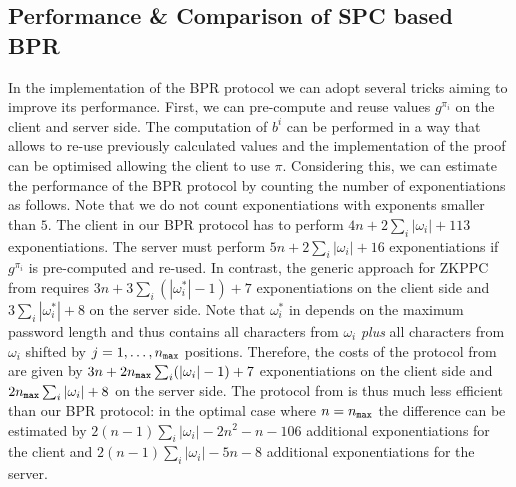 \subsection{Performance \& Comparison of SPC based BPR} \label{sec:performance}
In the implementation of the \ac{BPR} protocol we can adopt several tricks aiming to improve its performance. First, we can pre-compute and reuse values $g^{\pi_i}$ on the client and server side.
The computation of $b^i$ can be performed in a way that allows to re-use previously calculated values and the implementation of the proof can be optimised allowing the client to use $\pi$.
Considering this, we can estimate the performance of the \ac{BPR} protocol by counting the number of exponentiations as follows.
Note that we do not count exponentiations with exponents smaller than $5$.
%
The client in our BPR protocol has to perform $4n+2\sum_i |\omega_i| + 113$ exponentiations.
The server must perform $5n + 2\sum_i |\omega_i| + 16$ exponentiations if $g^{\pi_i}$ is pre-computed and re-used.
In contrast, the generic approach for ZKPPC from \cite{KieferM14} requires $3n+3\sum_i (|\omega^\ast_i|-1)+7$ exponentiations on the client side and $3\sum_i |\omega^\ast_i|+8$ on the server side.
Note that $\omega^\ast_i$ in \cite{KieferM14} depends on the maximum password length and thus contains all characters from $\omega_i$ \emph{plus} all characters from $\omega_i$ shifted by $j = 1,\ldots, {n_\mathtt{max}}$ positions.
Therefore, the costs of the protocol from \cite{KieferM14} are given by $3n+2{n_\mathtt{max}}\sum_i (|\omega_i|-1)+7$ exponentiations on the client side and $2{n_\mathtt{max}}\sum_i |\omega_i|+8$ on the server side. The protocol from \cite{KieferM14} is thus much less efficient than our BPR protocol: in the optimal case where $n={n_\mathtt{max}}$ the difference can be estimated by  $2(n-1)\sum_i|\omega_i| - 2n^2 - n - 106$ additional exponentiations for the client and $2(n-1)\sum_i|\omega_i| - 5n - 8$ additional exponentiations for the server.

